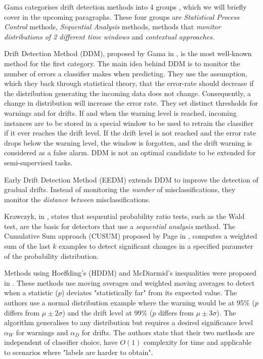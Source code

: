Gama categorises drift detection methods into 4 groups \cite{Gama:2014:SCD:2597757.2523813}, which we will briefly cover in the upcoming paragraphs. These four groups are \textit{Statistical Process Control} methods, \textit{Sequential Analysis} methods, methods that \textit{monitor distributions of 2 different time windows} and \textit{contextual approaches}.

Drift Detection Method (DDM), proposed by Gama in \cite{gama2004learning}, is the most well-known method for the first category. The main idea behind DDM is to monitor the number of errors a classifier makes when predicting. They use the assumption, which they back through statistical theory, that the error-rate should decrease if the distribution generating the incoming data does not change. Consequently, a change in distribution will increase the error rate. They set distinct thresholds for warnings and for drifts. If and when the warning level is reached, incoming instances are to be stored in a special window to be used to retrain the classifier if it ever reaches the drift level. If the drift level is not reached and the error rate drops below the warning level, the window is forgotten, and the drift warning is considered as a false alarm. DDM is not an optimal candidate to be extended for semi-supervised tasks.

Early Drift Detection Method (EEDM) \cite{baena2006early} extends DDM to improve the detection of gradual drifts. Instead of monitoring the \textit{number} of misclassifications, they monitor the \textit{distance between} misclassifications.

Krawczyk, in \cite{KRAWCZYK2017132}, states that sequential probability ratio tests, such as the Wald test, are the basis for detectors that use a \textit{sequential analysis} method.
The Cumulative Sum approach (CUSUM) proposed by Page in \cite{page1954continuous}, computes a weighted sum of the last $k$ examples to detect significant changes in a specified parameter of the probability distribution.

Methods using Hoeffding's (HDDM) and McDiarmid's inequalities were proposed in \cite{frias2015online}. These methods use moving averages and weighted moving averages to detect when a statistic ($p$) deviates "statistically far" from its expected value. The authors use a normal distribution example where the warning would be at 95\% ($p$ differs from $\mu\pm 2\sigma$) and the drift level at 99\% ($p$ differs from $\mu\pm 3\sigma$). The algorithm generalises to any distribution but requires a desired significance level $\alpha_W$ for warnings and $\alpha_D$ for drifts. The authors state that their two methods are independent of classifier choice, have $O(1)$ complexity for time and applicable to scenarios where "labels are harder to obtain". 

